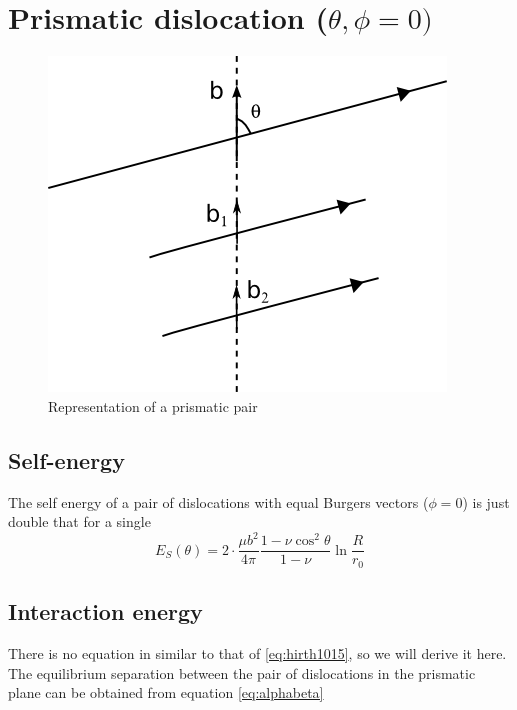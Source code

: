 \documentclass[10pt,a4paper,final]{article}
\begin{document}
\section{Prismatic dislocation ($\theta, \phi= 0)$}
\begin{figure}[hbtp]
\centering
\includegraphics[scale=1]{png/prism_schema.png}
\caption{Representation of a prismatic pair}
\end{figure}
\subsection{Self-energy}
The self energy of a pair of dislocations with equal Burgers vectors ($\phi=0$) is just double that for a single
\begin{equation}
E_S(\theta) = 2\cdot\frac{\mu b^2}{4\pi}\frac{1-\nu\cos^2\theta}{1-\nu}\ln\frac{R}{r_0} \label{eq:selfprism}
\end{equation}

\subsection{Interaction energy}
There is no equation in \cite{hirth1982theory} similar to that of \ref{eq:hirth1015}, so we will derive it here.
The equilibrium separation between the pair of dislocations in the prismatic plane can be obtained from equation \ref{eq:alphabeta}
\end{document}
